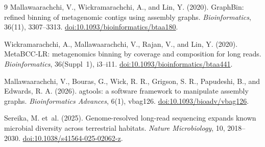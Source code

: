 \documentclass[11pt]{article}
\begin{document}
\begin{thebibliography}{9}
Mallawaarachchi, V., Wickramarachchi, A., and Lin, Y. (2020).
GraphBin: refined binning of metagenomic contigs using assembly graphs.
\emph{Bioinformatics}, 36(11), 3307--3313.
\href{https://doi.org/10.1093/bioinformatics/btaa180}{doi:10.1093/bioinformatics/btaa180}.

Wickramarachchi, A., Mallawaarachchi, V., Rajan, V., and Lin, Y. (2020).
MetaBCC-LR: metagenomics binning by coverage and composition for long reads.
\emph{Bioinformatics}, 36(Suppl~1), i3--i11.
\href{https://doi.org/10.1093/bioinformatics/btaa441}{doi:10.1093/bioinformatics/btaa441}.

Mallawaarachchi, V., Bouras, G., Wick, R. R., Grigson, S. R., Papudeshi, B., and Edwards, R. A. (2026).
agtools: a software framework to manipulate assembly graphs.
\emph{Bioinformatics Advances}, 6(1), vbag126.
\href{https://doi.org/10.1093/bioadv/vbag126}{doi:10.1093/bioadv/vbag126}.

Sereika, M. et~al. (2025).
Genome-resolved long-read sequencing expands known microbial diversity across terrestrial habitats.
\emph{Nature Microbiology}, 10, 2018--2030.
\href{https://doi.org/10.1038/s41564-025-02062-z}{doi:10.1038/s41564-025-02062-z}.

\end{thebibliography}
\end{document}
